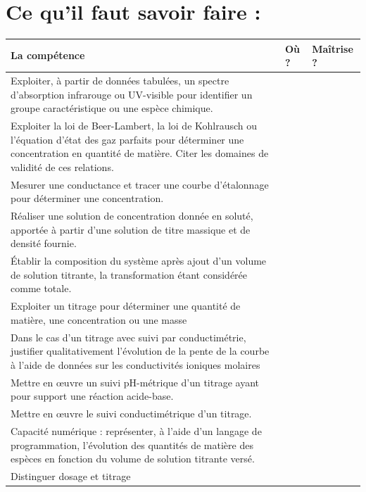 \documentclass[a4paper,11pt,fleqn]{article}%
\begin{document}
\section*{Ce qu'il faut savoir faire :}
\begin{table}[h!]
    \begin{tabular}{|m{.84\linewidth}|m{.04\linewidth}|m{.08\linewidth}|}
        \hline
        \textbf{La compétence} & \textbf{Où ?} & \textbf{Maîtrise ?} \\
        \hline
        Exploiter, à partir de données tabulées, un spectre d’absorption infrarouge ou UV-visible pour identifier un groupe caractéristique ou une espèce chimique. & & \\
        \hline
        Exploiter la loi de Beer-Lambert, la loi de Kohlrausch ou l’équation d’état des gaz parfaits pour déterminer une concentration en quantité de matière. Citer les domaines de validité de ces relations.& & \\
        \hline
        Mesurer une conductance et tracer une courbe d’étalonnage pour déterminer une concentration. & & \\
        \hline
        Réaliser une solution de concentration donnée en soluté, apportée à partir d’une solution de titre massique et de densité fournie. & & \\
        Établir la composition du système après ajout d’un volume de solution titrante, la transformation étant considérée comme totale. & & \\
        \hline
        Exploiter un titrage pour déterminer une quantité de matière, une concentration ou une masse & & \\
        \hline
        Dans le cas d’un titrage avec suivi par conductimétrie, justifier qualitativement l’évolution de la pente de la courbe à l’aide de données sur les conductivités ioniques molaires& & \\
        \hline
        Mettre en œuvre un suivi pH-métrique d’un titrage ayant pour support une réaction acide-base.& & \\
        \hline
        Mettre en œuvre le suivi conductimétrique d’un titrage.& & \\
        \hline
        Capacité numérique : représenter, à l’aide d’un langage de programmation, l’évolution des quantités de matière des espèces en fonction du volume de solution titrante versé. & & \\
        \hline
        Distinguer dosage et titrage& & \\
        \hline
    \end{tabular}
\end{table}
\end{document}
